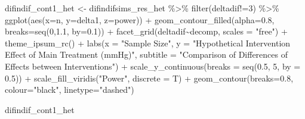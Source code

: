 \documentclass[
]{article}
\newenvironment{Shaded}{\begin{snugshade}}{\end{snugshade}}
\newcommand{\AttributeTok}[1]{\textcolor[rgb]{0.77,0.63,0.00}{#1}}
\newcommand{\DecValTok}[1]{\textcolor[rgb]{0.00,0.00,0.81}{#1}}
\newcommand{\FloatTok}[1]{\textcolor[rgb]{0.00,0.00,0.81}{#1}}
\newcommand{\FunctionTok}[1]{\textcolor[rgb]{0.00,0.00,0.00}{#1}}
\newcommand{\NormalTok}[1]{#1}
\newcommand{\OtherTok}[1]{\textcolor[rgb]{0.56,0.35,0.01}{#1}}
\newcommand{\SpecialCharTok}[1]{\textcolor[rgb]{0.00,0.00,0.00}{#1}}
\newcommand{\StringTok}[1]{\textcolor[rgb]{0.31,0.60,0.02}{#1}}
\begin{document}
\begin{Shaded}
\begin{Highlighting}[]
\NormalTok{difindif\_cont1\_het }\OtherTok{\textless{}{-}}\NormalTok{ difindifsims\_res\_het }\SpecialCharTok{\%\textgreater{}\%} 
  \FunctionTok{filter}\NormalTok{(deltadif}\SpecialCharTok{!=}\DecValTok{3}\NormalTok{) }\SpecialCharTok{\%\textgreater{}\%} 
  \FunctionTok{ggplot}\NormalTok{(}\FunctionTok{aes}\NormalTok{(}\AttributeTok{x=}\NormalTok{n, }\AttributeTok{y=}\NormalTok{delta1, }\AttributeTok{z=}\NormalTok{power)) }\SpecialCharTok{+}
  \FunctionTok{geom\_contour\_filled}\NormalTok{(}\AttributeTok{alpha=}\FloatTok{0.8}\NormalTok{, }\AttributeTok{breaks=}\FunctionTok{seq}\NormalTok{(}\DecValTok{0}\NormalTok{,}\FloatTok{1.1}\NormalTok{, }\AttributeTok{by=}\FloatTok{0.1}\NormalTok{)) }\SpecialCharTok{+}
  \FunctionTok{facet\_grid}\NormalTok{(deltadif}\SpecialCharTok{\textasciitilde{}}\NormalTok{decomp, }\AttributeTok{scales =} \StringTok{"free"}\NormalTok{) }\SpecialCharTok{+}
  \FunctionTok{theme\_ipsum\_rc}\NormalTok{() }\SpecialCharTok{+}
  \FunctionTok{labs}\NormalTok{(}\AttributeTok{x =} \StringTok{"Sample Size"}\NormalTok{,}
       \AttributeTok{y =} \StringTok{"Hypothetical Intervention Effect of Main Treatment (mmHg)"}\NormalTok{,}
       \AttributeTok{subtitle =} \StringTok{"Comparison of Differences of Effects between Interventions"}\NormalTok{) }\SpecialCharTok{+}
  \FunctionTok{scale\_y\_continuous}\NormalTok{(}\AttributeTok{breaks =} \FunctionTok{seq}\NormalTok{(}\FloatTok{0.5}\NormalTok{, }\DecValTok{5}\NormalTok{, }\AttributeTok{by =} \FloatTok{0.5}\NormalTok{)) }\SpecialCharTok{+}
  \FunctionTok{scale\_fill\_viridis}\NormalTok{(}\StringTok{"Power"}\NormalTok{, }\AttributeTok{discrete =}\NormalTok{ T) }\SpecialCharTok{+}
  \FunctionTok{geom\_contour}\NormalTok{(}\AttributeTok{breaks=}\FloatTok{0.8}\NormalTok{, }\AttributeTok{colour=}\StringTok{"black"}\NormalTok{, }\AttributeTok{linetype=}\StringTok{"dashed"}\NormalTok{)    }

\NormalTok{difindif\_cont1\_het}
\end{Highlighting}
\end{Shaded}
\end{document}
